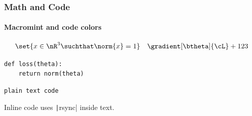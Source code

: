 \documentclass[notheorems,aspectratio=169]{beamer}
\begin{document}
\begin{frame}[fragile]
  \frametitle{Math and Code}
  \framesubtitle{Macromint and code colors}

  \[
    \set{x \in \nR^3 \suchthat \norm{x} = 1}
    \quad
    \gradient[\btheta]{\cL} + 123
  \]

  \begin{verbatim}
def loss(theta):
    return norm(theta)
  \end{verbatim}

  \begin{verbatim}
plain text code
  \end{verbatim}

  Inline code uses \texttt|rsync| inside text.
\end{frame}
\end{document}

